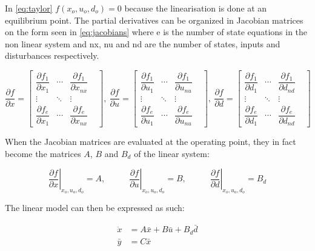 In \cref{eq:taylor} $f(x_o, u_o, d_o) = 0$ because the linearisation is done at an equilibrium point. The partial derivatives can be organized in Jacobian matrices on the form seen in \cref{eq:jacobians} where e is the number of state equations in the non linear system and nx, nu and nd are the number of states, inputs and disturbances respectively.

\begin{equation} \label{eq:jacobians}
	\dfrac{\partial f}{\partial x} =
		\begin{bmatrix}
			\dfrac{\partial f_1}{\partial x_1} & \cdots & \dfrac{\partial f_1}{\partial x_{nx}} & \\
			\vdots & \ddots & \vdots & \\
			\dfrac{\partial f_e}{\partial x_1} & \cdots & \dfrac{\partial f_e}{\partial x_{nx}} &
		\end{bmatrix}, \
	\dfrac{\partial f}{\partial u} =
		\begin{bmatrix}
			\dfrac{\partial f_1}{\partial u_1} & \cdots & \dfrac{\partial f_1}{\partial u_{nu}} & \\
			\vdots & \ddots & \vdots & \\
			\dfrac{\partial f_e}{\partial u_1} & \cdots & \dfrac{\partial f_e}{\partial u_{nu}} &
		\end{bmatrix}, \
	\dfrac{\partial f}{\partial d} =
		\begin{bmatrix}
			\dfrac{\partial f_1}{\partial d_1} & \cdots & \dfrac{\partial f_1}{\partial d_{nd}} & \\
			\vdots & \ddots & \vdots & \\
			\dfrac{\partial f_e}{\partial d_1} & \cdots & \dfrac{\partial f_e}{\partial d_{nd}} &
		\end{bmatrix}
\end{equation}

When the Jacobian matrices are evaluated at the operating point, they in fact become the matrices $ A $, $ B $ and $ B_d  $ of the linear system:

\begin{equation}
	\left. \dfrac{\partial f}{\partial x} \right |_{x_o, u_o, d_o} = A, \;\;\;\;\;\;\;\;\;\;
	\left. \dfrac{\partial f}{\partial u} \right |_{x_o, u_o, d_o} = B, \;\;\;\;\;\;\;\;\;\;
	\left. \dfrac{\partial f}{\partial d} \right |_{x_o, u_o, d_o} = B_d
\end{equation}

The linear model can then be expressed as such:

\begin{equation} \label{eq:state_space_linear}
	\begin{split}
		\dot{x} & = A\bar{x} + B\bar{u} + B_d\bar{d} \\
		\bar{y} & = C\bar{x}
	\end{split}
\end{equation}

